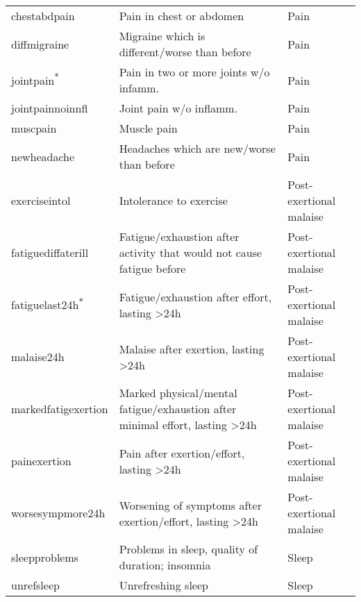 \begin{tabular}{lll}
chestabdpain     & Pain in chest or abdomen & Pain \\
diffmigraine     & Migraine which is different/worse than before & Pain \\
jointpain\textsuperscript{${\ast}$}    & Pain in two or more joints w/o infamm. & Pain \\
jointpainnoinnfl & Joint pain w/o inflamm. & Pain \\
muscpain         & Muscle pain & Pain \\
newheadache      & Headaches which are new/worse than before & Pain \\
exerciseintol       & Intolerance to exercise & Post-exertional malaise \\
fatiguediffaterill  & Fatigue/exhaustion after activity that would not cause fatigue before & Post-exertional malaise \\
fatiguelast24h\textsuperscript{${\ast}$}  & Fatigue/exhaustion after effort, lasting >24h & Post-exertional malaise \\
malaise24h          & Malaise after exertion, lasting >24h & Post-exertional malaise \\
markedfatigexertion & Marked physical/mental fatigue/exhaustion after minimal effort, lasting >24h & Post-exertional malaise \\
painexertion        & Pain after exertion/effort, lasting >24h & Post-exertional malaise \\
worsesympmore24h    & Worsening of symptoms after exertion/effort, lasting >24h & Post-exertional malaise \\
sleepproblems   & Problems in sleep, quality of duration; insomnia & Sleep \\
unrefsleep      & Unrefreshing sleep & Sleep \\
\bottomrule
\end{tabular}